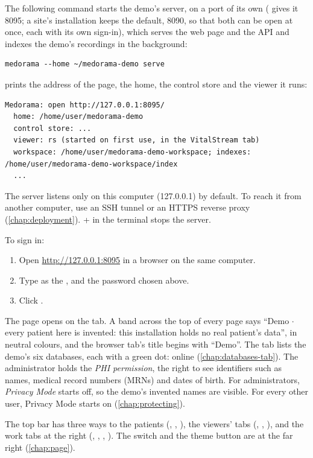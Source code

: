 The following command starts the demo's server, on a port of its own (
gives it 8095; a site's installation keeps the default, 8090, so that both can be open at
once, each with its own sign-in), which serves the web page and the API and indexes the demo's
recordings in the background:
\begin{lstlisting}[style=shell]
medorama --home ~/medorama-demo serve
\end{lstlisting}
 prints the address of the page, the home, the control store and the viewer it
runs:
\begin{lstlisting}[style=text]
Medorama: open http://127.0.0.1:8095/
  home: /home/user/medorama-demo
  control store: ...
  viewer: rs (started on first use, in the VitalStream tab)
  workspace: /home/user/medorama-demo-workspace; indexes: /home/user/medorama-demo-workspace/index
  ...
\end{lstlisting}
The server listens only on this computer (127.0.0.1) by default. To reach it from another
computer, use an SSH tunnel or an HTTPS reverse proxy (\cref{chap:deployment}).
+ in the terminal stops the server.

To sign in:
\begin{enumerate}
\item Open \url{http://127.0.0.1:8095} in a browser on the same computer.
\item Type  as the , and the password chosen above.
\item Click .
\end{enumerate}
The page opens on the  tab. A band across the top of every page says ``Demo
$\cdot$ every patient here is invented: this installation holds no real patient's data'', in
neutral colours, and the browser tab's title begins with ``Demo''. The  tab lists the demo's six databases,
each with a green dot: online (\cref{chap:databases-tab}). The administrator holds the \emph{PHI permission}, the
right to see identifiers such as names, medical record numbers (MRNs) and dates of birth. For
administrators, \emph{Privacy Mode} starts off, so the demo's invented names are visible. For
every other user, Privacy Mode starts on (\cref{chap:protecting}).

The top bar has three ways to the patients (, ,
), the viewers' tabs (, , ), and the work tabs at
the right (, , , ). The
 switch and the theme button are at the far right (\cref{chap:page}).

